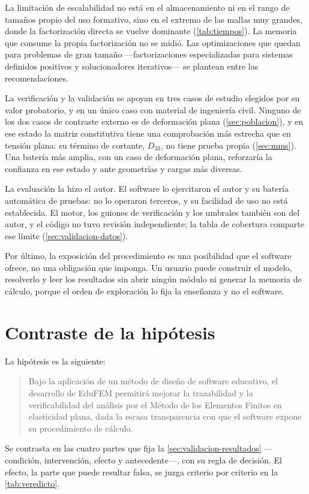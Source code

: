 La limitación de escalabilidad no está en el almacenamiento ni en el rango de tamaños propio del uso formativo, sino en el extremo de las mallas muy grandes, donde la factorización directa se vuelve dominante (\autoref{tab:tiempos}). La memoria que consume la propia factorización no se midió. Las optimizaciones que quedan para problemas de gran tamaño —factorizaciones especializadas para sistemas definidos positivos y solucionadores iterativos— se plantean entre las recomendaciones.

La verificación y la validación se apoyan en tres casos de estudio elegidos por su valor probatorio, y en un único caso con material de ingeniería civil. Ninguno de los dos casos de contraste externo es de deformación plana (\autoref{sec:poblacion}), y en ese estado la matriz constitutiva tiene una comprobación más estrecha que en tensión plana: su término de cortante, $D_{33}$, no tiene prueba propia (\autoref{sec:mms}). Una batería más amplia, con un caso de deformación plana, reforzaría la confianza en ese estado y ante geometrías y cargas más diversas.

La evaluación la hizo el autor. El software lo ejercitaron el autor y su batería automática de pruebas: no lo operaron terceros, y su facilidad de uso no está establecida. El motor, los guiones de verificación y los umbrales también son del autor, y el código no tuvo revisión independiente; la tabla de cobertura comparte ese límite (\autoref{sec:validacion-datos}).

Por último, la exposición del procedimiento es una posibilidad que el software ofrece, no una obligación que imponga. Un usuario puede construir el modelo, resolverlo y leer los resultados sin abrir ningún módulo ni generar la memoria de cálculo, porque el orden de exploración lo fija la enseñanza y no el software.

\section{Contraste de la hipótesis}
\label{sec:validacion-hipotesis}
\begingroup
\renewcommand{\floatpagefraction}{0.85}
\renewcommand{\topfraction}{0.85}
\renewcommand{\textfraction}{0.10}

La hipótesis es la siguiente:
\begin{quote}
Bajo la aplicación de un método de diseño de software educativo, el desarrollo de EduFEM permitirá mejorar la trazabilidad y la verificabilidad del análisis por el Método de los Elementos Finitos en elasticidad plana, dada la escasa transparencia con que el software expone su procedimiento de cálculo.
\end{quote}
Se contrasta en las cuatro partes que fija la \autoref{sec:validacion-resultados} ---condición, intervención, efecto y antecedente---, con su regla de decisión. El efecto, la parte que puede resultar falsa, se juzga criterio por criterio en la \autoref{tab:veredicto}.

